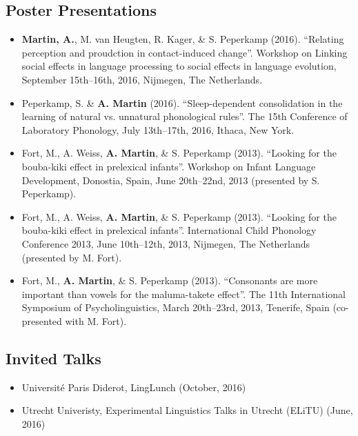 \documentclass[a4paper, 10pt]{article}
\newcommand{\engquote}[1]{“#1”}
\begin{document}
\subsection*{Poster Presentations}

\begin{itemize}

\item \textbf{Martin, A.}, M. van Heugten, R. Kager, \& S. Peperkamp (2016).
  \enquote{Relating perception and proudction in contact-induced
    change}. Workshop on Linking social effects in language processing
  to social effects in language evolution, September 15th--16th, 2016,
  Nijmegen, The Netherlands.


\item Peperkamp, S. \& \textbf{A. Martin}
  (2016). \enquote{Sleep-dependent consolidation in the learning of
    natural vs. unnatural phonological rules}. The 15th Conference of
  Laboratory Phonology, July 13th--17th, 2016, Ithaca, New York.

\item Fort, M., A. Weiss, \textbf{A. Martin}, \& S. Peperkamp (2013). \enquote{Looking for
  the bouba-kiki effect in prelexical infants}. Workshop on Infant
  Language Development, Donostia, Spain, June 20th--22nd, 2013
  (presented by S. Peperkamp).

\item Fort, M., A. Weiss, \textbf{A. Martin}, \& S. Peperkamp
  (2013\nobreak\hspace{.05em}). \engquote{Looking for the
    bouba-kiki effect in prelexical infants}. International Child
  Phonology Conference 2013, June 10th--12th, 2013, Nijmegen, The
  {Netherlands} (presented by M. Fort).

\item Fort, M., \textbf{A. Martin}, \& S. Peperkamp (2013\nobreak\hspace{.05em}). \engquote{Consonants are more
    important than vowels for the maluma-takete effect}. The 11th
  International Symposium of Psycholinguistics, March 20th--23rd, 2013,
  Tenerife, {Spain} (co-presented with M. Fort).

\end{itemize}


\subsection*{Invited Talks}

\begin{itemize}

\item Université Paris Diderot, LingLunch (October, 2016)

\item Utrecht Univeristy, Experimental Linguistics Talks in Utrecht
  (ELiTU) (June, 2016)

\end{itemize}
\end{document}
